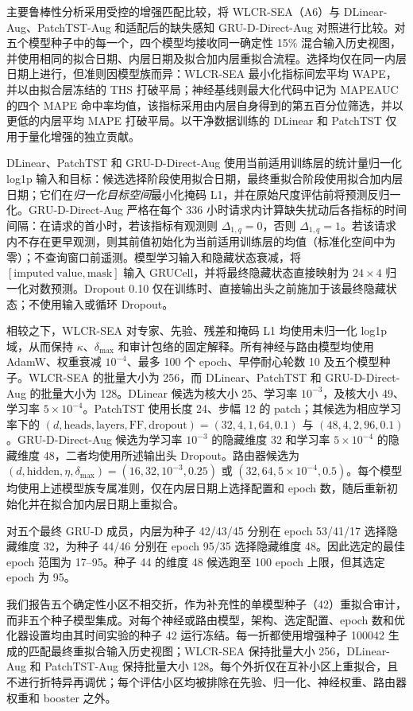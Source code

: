 \documentclass[10pt,conference,letterpaper]{IEEEtran}
\newcommand{\method}{WLCR-SEA}
\begin{document}
主要鲁棒性分析采用受控的增强匹配比较，将 \method{}（A6）与 DLinear-Aug、PatchTST-Aug 和适配后的缺失感知 GRU-D-Direct-Aug 对照进行比较。对五个模型种子中的每一个，四个模型均接收同一确定性 15\% 混合输入历史视图，并使用相同的拟合日期、内层日期及拟合加内层重拟合流程。选择均仅在同一内层日期上进行，但准则因模型族而异：WLCR-SEA 最小化指标间宏平均 WAPE，并以由拟合层冻结的 THS 打破平局；神经基线则最大化代码中记为 MAPEAUC 的四个 MAPE 命中率均值，该指标采用由内层自身得到的第五百分位筛选，并以更低的内层平均 MAPE 打破平局。以干净数据训练的 DLinear 和 PatchTST 仅用于量化增强的独立贡献。

DLinear、PatchTST 和 GRU-D-Direct-Aug 使用当前适用训练层的统计量归一化 log1p 输入和目标：候选选择阶段使用拟合日期，最终重拟合阶段使用拟合加内层日期；它们在\emph{归一化目标空间}最小化掩码 L1，并在原始尺度评估前将预测反归一化。GRU-D-Direct-Aug 严格在每个 336 小时请求内计算缺失扰动后各指标的时间间隔：在请求的首小时，若该指标有观测则 $\Delta_{1,q}=0$，否则 $\Delta_{1,q}=1$。若该请求内不存在更早观测，则其前值初始化为当前适用训练层的均值（标准化空间中为零）；不查询窗口前遥测。模型学习输入和隐藏状态衰减，将 $[\mathrm{imputed\ value},\mathrm{mask}]$ 输入 GRUCell，并将最终隐藏状态直接映射为 $24\times4$ 归一化对数预测。Dropout 0.10 仅在训练时、直接输出头之前施加于该最终隐藏状态；不使用输入或循环 Dropout。

相较之下，WLCR-SEA 对专家、先验、残差和掩码 L1 均使用未归一化 log1p 域，从而保持 $\kappa$、$\delta_{\max}$ 和审计包络的固定解释。所有神经与路由模型均使用 AdamW、权重衰减 $10^{-4}$、最多 100 个 epoch、早停耐心轮数 10 及五个模型种子。WLCR-SEA 的批量大小为 256，而 DLinear、PatchTST 和 GRU-D-Direct-Aug 的批量大小为 128。DLinear 候选为核大小 25、学习率 $10^{-3}$，及核大小 49、学习率 $5\times10^{-4}$。PatchTST 使用长度 24、步幅 12 的 patch；其候选为相应学习率下的 $(d,\mathrm{heads},\mathrm{layers},\mathrm{FF},\mathrm{dropout})=(32,4,1,64,0.1)$ 与 $(48,4,2,96,0.1)$。GRU-D-Direct-Aug 候选为学习率 $10^{-3}$ 的隐藏维度 32 和学习率 $5\times10^{-4}$ 的隐藏维度 48，二者均使用所述输出头 Dropout。路由器候选为 $(d,\mathrm{hidden},\eta,\delta_{\max})=(16,32,10^{-3},0.25)$ 或 $(32,64,5\times10^{-4},0.5)$。每个模型均使用上述模型族专属准则，仅在内层日期上选择配置和 epoch 数，随后重新初始化并在拟合加内层日期上重拟合。

对五个最终 GRU-D 成员，内层为种子 42/43/45 分别在 epoch 53/41/17 选择隐藏维度 32，为种子 44/46 分别在 epoch 95/35 选择隐藏维度 48。因此选定的最佳 epoch 范围为 17--95。种子 44 的维度 48 候选跑至 100 epoch 上限，但其选定 epoch 为 95。

我们报告五个确定性小区不相交折，作为补充性的单模型种子（42）重拟合审计，而非五个种子模型集成。对每个神经或路由模型，架构、选定配置、epoch 数和优化器设置均由其时间实验的种子 42 运行冻结。每一折都使用增强种子 100042 生成的匹配最终重拟合输入历史视图；WLCR-SEA 保持批量大小 256，DLinear-Aug 和 PatchTST-Aug 保持批量大小 128。每个外折仅在互补小区上重拟合，且不进行折特异再调优；每个评估小区均被排除在先验、归一化、神经权重、路由器权重和 booster 之外。
\end{document}
